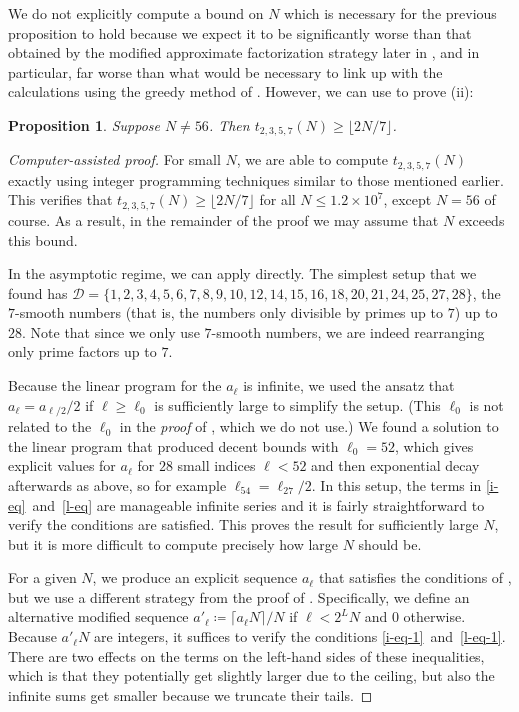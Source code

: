 \documentclass[10pt,a4paper,reqno]{amsart}
\numberwithin{equation}{section}
\theoremstyle{plain}
\newtheorem{proposition}[theorem]{Proposition}
\theoremstyle{definition}
\begin{document}
We do not explicitly compute a bound on $N$ which is necessary for the previous proposition to hold because we expect it to be significantly worse than that obtained by the modified approximate factorization strategy later in , and in particular, far worse than what would be necessary to link up with the calculations using the greedy method of .
However, we can use  to prove (ii):
\begin{proposition}\label{two-sevenths} Suppose $N\ne 56$.  Then $t_{2,3,5,7}(N) \ge \lfloor 2N/7\rfloor$.
\end{proposition}
\begin{proof}[Computer-assisted proof]
For small $N$, we are able to compute $t_{2,3,5,7}(N)$ exactly using integer programming techniques similar to those mentioned earlier.
This verifies that $t_{2,3,5,7}(N)\ge \lfloor 2N/7\rfloor$ for all $N\le 1.2\times 10^7$, except $N=56$ of course.
As a result, in the remainder of the proof we may assume that $N$ exceeds this bound.

In the asymptotic regime, we can apply  directly.
The simplest setup that we found has $\mathcal{D}=\{1,2,3,4,5,6,7,8,9,10,12,14,15,16,18,20,21,24,25,27,28\}$, the $7$-smooth numbers (that is, the numbers only divisible by primes up to $7$) up to $28$.
Note that since we only use $7$-smooth numbers, we are indeed rearranging only prime factors up to $7$.

Because the linear program for the $a_\ell$ is infinite, we used the ansatz that $a_\ell = a_{\ell/2}/2$ if $\ell\ge \ell_0$ is sufficiently large to simplify the setup.
(This $\ell_0$ is not related to the $\ell_0$ in the \emph{proof} of , which we do not use.)
We found a solution to the linear program that produced decent bounds with $\ell_0 = 52$, which gives explicit values for $a_\ell$ for $28$ small indices $\ell<52$ and then exponential decay afterwards as above, so for example $\ell_{54}=\ell_{27}/2$.
In this setup, the terms in \eqref{i-eq}~and~\eqref{l-eq} are manageable infinite series and it is fairly straightforward to verify the conditions are satisfied.
This proves the result for sufficiently large $N$, but it is more difficult to compute precisely how large $N$ should be.

For a given $N$, we produce an explicit sequence $a_\ell$ that satisfies the conditions of , but we use a different strategy from the proof of .
Specifically, we define an alternative modified sequence $ a'_\ell \coloneqq \lceil a_\ell N \rceil/N$ if $\ell < 2^L N$ and $0$ otherwise.
Because $a'_\ell N$ are integers, it suffices to verify the conditions \eqref{i-eq-1}~and~\eqref{l-eq-1}.
There are two effects on the terms on the left-hand sides of these inequalities, which is that they potentially get slightly larger due to the ceiling, but also the infinite sums get smaller because we truncate their tails.


\end{proof}
\end{document}
